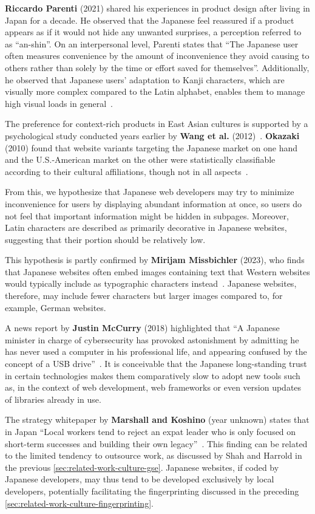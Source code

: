 \textbf{Riccardo Parenti} (2021) shared his experiences in product design after living in Japan for a decade.
He observed that the Japanese feel reassured if a product appears as if it would not hide any unwanted surprises, a perception referred to as ``an-shin''.
On an interpersonal level, Parenti states that ``The Japanese user often measures convenience by the amount of inconvenience they avoid causing to others rather than solely by the time or effort saved for themselves''.
Additionally, he observed that Japanese users' adaptation to Kanji characters, which are visually more complex compared to the Latin alphabet, enables them to manage high visual loads in general~\cite{Parenti2021}.

The preference for context-rich products in East Asian cultures is supported by a psychological study conducted years earlier by \textbf{Wang et al.} (2012)~\cite{Wang2012}.
\textbf{Okazaki} (2010) found that website variants targeting the Japanese market on one hand and the U.S.-American market on the other were statistically classifiable according to their cultural affiliations, though not in all aspects~\cite{Okazaki2004}.

From this, we hypothesize that Japanese web developers may try to minimize inconvenience for users by displaying abundant information at once, so users do not feel that important information might be hidden in subpages.
Moreover, Latin characters are described as primarily decorative in Japanese websites, suggesting that their portion should be relatively low.

This hypothesis is partly confirmed by \textbf{Mirijam Missbichler} (2023), who finds that Japanese websites often embed images containing text that Western websites would typically include as typographic characters instead~\cite{Missbichler2023}.
Japanese websites, therefore, may include fewer characters but larger images compared to, for example, German websites.

A news report by \textbf{Justin McCurry} (2018) highlighted that ``A Japanese minister in charge of cybersecurity has provoked astonishment by admitting he has never used a computer in his professional life, and appearing confused by the concept of a USB drive''~\cite{McCurry2018}.
It is conceivable that the Japanese long-standing trust in certain technologies makes them comparatively slow to adopt new tools such as, in the context of web development, web frameworks or even version updates of libraries already in use.

The strategy whitepaper by \textbf{Marshall and Koshino} (year unknown) states that in Japan ``Local workers tend to reject an expat leader who is only focused on short-term successes and building their own legacy''~\cite{Marshall}.
This finding can be related to the limited tendency to outsource work, as discussed by Shah and Harrold in the previous \cref{sec:related-work-culture-gse}.
Japanese websites, if coded by Japanese developers, may thus tend to be developed exclusively by local developers, potentially facilitating the fingerprinting discussed in the preceding \cref{sec:related-work-culture-fingerprinting}.

